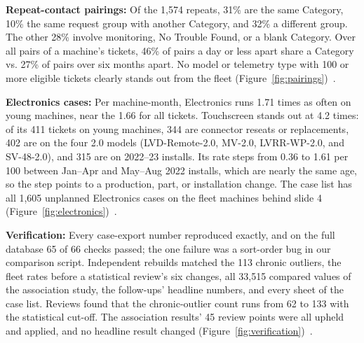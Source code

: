 \smallskip\noindent\textbf{Repeat-contact pairings:}
Of the 1,574 repeats, 31\% are the same Category, 10\% the same request group with another Category, and 32\% a different group. The other 28\% involve monitoring, No Trouble Found, or a blank Category. Over all pairs of a machine's tickets, 46\% of pairs a day or less apart share a Category vs. 27\% of pairs over six months apart. No model or telemetry type with 100 or more eligible tickets clearly stands out from the fleet (Figure~\ref{fig:pairings})~\cite{nb03}.

\smallskip\noindent\textbf{Electronics cases:}
Per machine-month, Electronics runs 1.71 times as often on young machines, near the 1.66 for all tickets. Touchscreen stands out at 4.2 times: of its 411 tickets on young machines, 344 are connector reseats or replacements, 402 are on the four 2.0 models (LVD-Remote-2.0, MV-2.0, LVRR-WP-2.0, and SV-48-2.0), and 315 are on 2022--23 installs. Its rate steps from 0.36 to 1.61 per 100 between Jan--Apr and May--Aug 2022 installs, which are nearly the same age, so the step points to a production, part, or installation change. The case list has all 1,605 unplanned Electronics cases on the fleet machines behind slide 4 (Figure~\ref{fig:electronics})~\cite{nb07}.

\smallskip\noindent\textbf{Verification:}
Every case-export number reproduced exactly, and on the full database 65 of 66 checks passed; the one failure was a sort-order bug in our comparison script. Independent rebuilds matched the 113 chronic outliers, the fleet rates before a statistical review's six changes, all 33,515 compared values of the association study, the follow-ups' headline numbers, and every sheet of the case list. Reviews found that the chronic-outlier count runs from 62 to 133 with the statistical cut-off. The association results' 45 review points were all upheld and applied, and no headline result changed (Figure~\ref{fig:verification})~\cite{nb08}.
